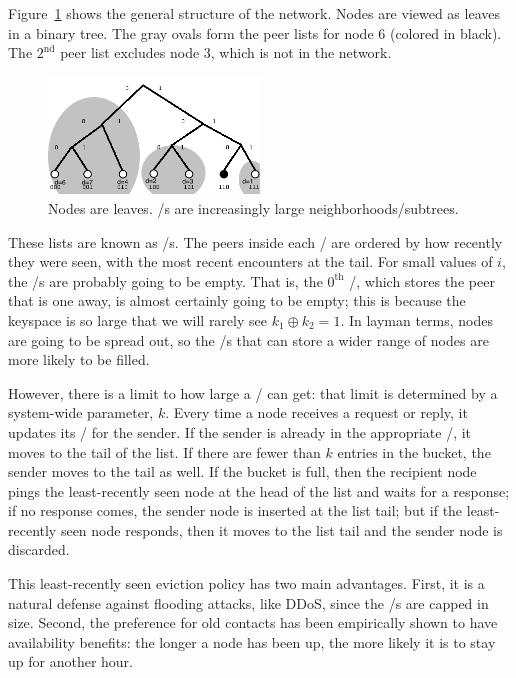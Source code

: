 \documentclass[11pt,twocolumn]{article}
\begin{document}
Figure~\ref{tree} shows the general structure of the network.
Nodes are viewed as leaves in a binary tree.
The gray ovals form the peer lists for node 6 (colored in black).
The $2^{\mathrm{nd}}$ peer list excludes node 3, which is not in the network.

\begin{figure}[h!]
  \centering
  \includegraphics[width=0.5\textwidth]{images/tree}
  \caption{\label{tree}Nodes are leaves. \kbucket/s are increasingly large neighborhoods/subtrees.}
\end{figure}

These lists are known as \kbucket/s.
The peers inside each \kbucket/ are ordered by how recently they were seen, with the most recent encounters at the tail.
For small values of $i$, the \kbucket/s are probably going to be empty.
That is, the $0^{\mathrm{th}}$ \kbucket/, which stores the peer that is one away, is almost certainly going to be empty; this is because the keyspace is so large that we will rarely see $k_1 \oplus k_2 = 1$.
In layman terms, nodes are going to be spread out, so the \kbucket/s that can store a wider range of nodes are more likely to be filled.

However, there is a limit to how large a \kbucket/ can get: that limit is determined by a system-wide parameter, $k$.
Every time a node receives a request or reply, it updates its \kbucket/ for the sender.
If the sender is already in the appropriate \kbucket/, it moves to the tail of the list.
If there are fewer than $k$ entries in the bucket, the sender moves to the tail as well.
If the bucket is full, then the recipient node pings the least-recently seen node at the head of the list and waits for a response; if no response comes, the sender node is inserted at the list tail; but if the least-recently seen node responds, then it moves to the list tail and the sender node is discarded.

This least-recently seen eviction policy has two main advantages.
First, it is a natural defense against flooding attacks, like DDoS, since the \kbucket/s are capped in size.
Second, the preference for old contacts has been empirically shown to have availability benefits: the longer a node has been up, the more likely it is to stay up for another hour.
\end{document}
